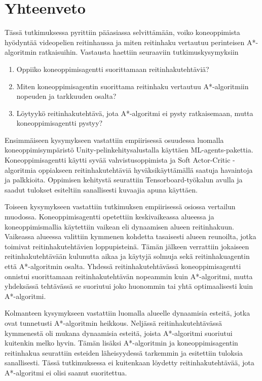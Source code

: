 \documentclass[utf8]{gradu3}
\begin{document}
\chapter{Yhteenveto}
\label{yhteenveto}

Tässä tutkimuksessa pyrittiin pääasiassa selvittämään, voiko koneoppimista hyödyntää videopelien reitinhaussa ja miten reitinhaku vertautuu perinteisen A*-algoritmin ratkaisuihin. Vastausta haettiin seuraaviin tutkimuskysymyksiin

\begin{enumerate}
\item Oppiiko koneoppimisagentti suorittamaan reitinhakutehtäviä?
\item Miten koneoppimisagentin suorittama reitinhaku vertautuu A*-algoritmiin nopeuden ja tarkkuuden osalta?
\item Löytyykö reitinhakutehtävä, jota A*-algoritmi ei pysty ratkaisemaan, mutta koneoppimisagentti pystyy?
\end{enumerate}

Ensimmäiseen kysymykseen vastattiin empiirisessä osuudessa luomalla koneoppimisympäristö Unity-pelinkehitysalustalla käyttäen ML-agents-pakettia. Koneoppimisagentti käytti syvää vahvistusoppimista ja Soft Actor-Critic -algoritmia oppiakseen reitinhakutehtäviä hyväksikäyttämällä saatuja havaintoja ja palkkioita. Oppimisen kehitystä seurattiin Tensorboard-työkalun avulla ja saadut tulokset esiteltiin sanallisesti kuvaajia apuna käyttäen.

Toiseen kysymykseen vastattiin tutkimuksen empiirisessä osiossa vertailun muodossa. Koneoppimisagentti opetettiin keskivaikeassa alueessa ja koneoppimismallia käytettiin vaikean eli dynaamisen alueen reitinhakuun. Vaikeassa alueessa valittiin kymmenen kohdetta tasaisesti alueen reunoilta, jotka toimivat reitinhakutehtävien loppupisteinä. Tämän jälkeen verrattiin jokaiseen reitinhakutehtävään kulunutta aikaa ja käytyjä solmuja sekä reitinhakuagentin että A*-algoritmin osalta. Yhdessä reitinhakutehtävässä koneoppimisagentti onnistui suorittamaan reitinhakutehtävän nopeammin kuin A*-algoritmi, mutta yhdeksässä tehtävässä se suoriutui joko huonommin tai yhtä optimaalisesti kuin A*-algoritmi.

Kolmanteen kysymykseen vastattiin luomalla alueelle dynaamisia esteitä, jotka ovat tunnetusti A*-algoritmin heikkous. Neljässä reitinhakutehtävässä kymmenestä oli mukana dynaamisia esteitä, joista A*-algoritmi suoriutui kuitenkin melko hyvin. Tämän lisäksi A*-algoritmin ja koneoppimisagentin reitinhakua seurattiin esteiden läheisyydessä tarkemmin ja esitettiin tuloksia sanallisesti. Tässä tutkimuksessa ei kuitenkaan löydetty reitinhakutehtävää, jota A*-algoritmi ei olisi saanut suoritettua.
\end{document}
